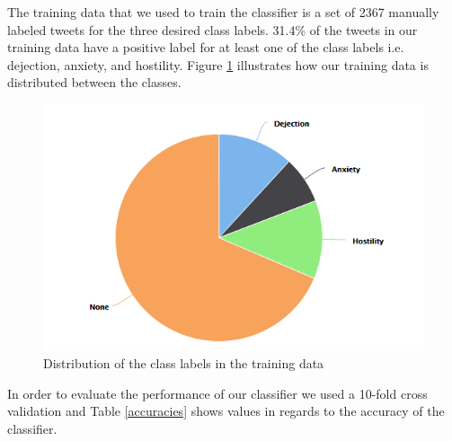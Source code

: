 \documentclass{article}
\begin{document}
The training data that we used to train the classifier is a set of 2367 manually labeled tweets for the three desired class labels. 31.4\% of the tweets in our training data have a positive label for at least one of the class labels i.e. dejection, anxiety, and hostility. Figure \ref{training} illustrates how our training data is distributed between the classes. 

\begin{figure}[ht]
\vskip 0.2in
\begin{center}
\centerline{\includegraphics[width=\columnwidth]{Figures/training.PNG}}
\caption{Distribution of the class labels in the training data}
\label{training}
\end{center}
\vskip -0.2in
\end{figure}

In order to evaluate the performance of our classifier we used a 10-fold cross validation and Table \ref{accuracies} shows values in regards to the accuracy of the classifier. 
\end{document}
